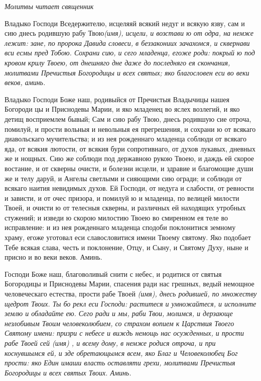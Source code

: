 \itshape Молитвы читает священник\normalfont{}

Владыко Господи Вседержителю, исцеляяй всякий недуг и всякую язву, сам и сию днесь родившую рабу Твою\itshape  (имя)\normalfont{}, исцели, и возстави ю от одра, на немже лежит: зане, по пророка Давида словеси, в беззакониих зачахомся, и сквернави вси есмы пред Тобою. Сохрани сию, и сего младенца, егоже роди: покрый ю под кровом крилу Твоею, от днешняго дне даже до последняго ея скончания, молитвами Пречистыя Богородицы и всех святых; яко благословен еси во веки веков, аминь. 


Владыко Господи Боже наш, родивыйся от Пречистыя Владычицы нашея Богороди цы и Приснодевы Марии, и яко младенец во яслех возлегий, и яко детищ восприемлем бывый; Сам и сию рабу Твою, днесь родившую сие отроча, помилуй, и прости вольныя и невольныя ея прегрешения, и сохрани ю от всякаго диавольскаго мучительства; и из нея рожденнаго младенца соблюди от всякаго яда, от всякия лютости, от всякия бури сопротивнаго, от духов лукавых, дневных же и нощных. Сию же соблюди под державною рукою Твоею, и даждь ей скорое востание, и от скверны очисти, и болезни исцели, и здравие и благомощие души же и телу даруй, и Ангелы светлыми и сияющими сию огради; и соблюди от всякаго наития невидимых духов. Ей Господи, от недуга и слабости, от ревности и зависти, и от очес призора, и помилуй ю и младенца, по велицей милости Твоей, и очисти ю от телесныя скверны, и различных ей находящих утробных стужений; и изведи ю скорою милостию Твоею во смиренном ея теле во исправление: и из нея рожденнаго младенца сподоби поклонитися земному храму, егоже уготовал еси славословитися имени Твоему святому. Яко подобает Тебе всякая слава, честь и поклонение, Отцу, и Сыну, и Святому Духу, ныне и присно и во веки веков. Аминь.  


Господи Боже наш, благоволивый снити с небес, и родитися от святыя Богородицы и Приснодевы Марии, спасения ради нас грешных, ведый немощное человеческаго естества, прости рабе Твоей \itshape (имя)\normalfont{}, днесь родившей, по множеству щедрот Твоих. Ты бо рекл еси Господи: раститеся и умножайтеся, и исполните землю и обладайте ею. Сего ради и мы, раби Твои, молимся, и дерзающе незлобивым Твоим человеколюбием, со страхом вопием к Царствия Твоего Святому имени: призри с небесе и виждь немощь нас осужденных, и прости рабе Твоей сей (\itshape имя\normalfont{}) , и всему дому, в немже родися отроча, и при коснувшымся ей, и зде обретающымся всем, яко Благ и Человеколюбец Бог прости: яко Един имаши власть оставляти грехи, молитвами Пречистыя Богородицы и всех святых Твоих. Аминь.





